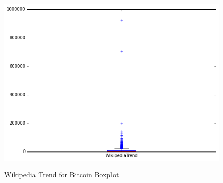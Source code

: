 \begin{figure}[bth]
  \myfloatalign
  {\includegraphics[width=1\linewidth]
    {gfx/wikipedia-trend-for-bitcoin-boxplot}}
  \caption{Wikipedia Trend for Bitcoin
    Boxplot}
  \label{fig:wikipedia-trend-for-bitcoin-boxplot}
\end{figure}

\clearpage






